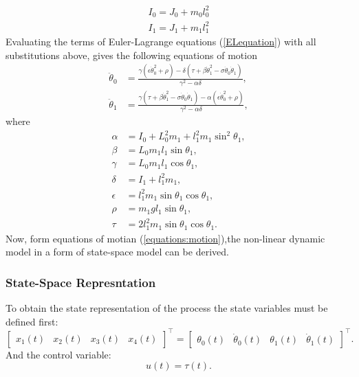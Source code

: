 \begin{subequations}
		\begin{align}
			I_0 = J_0 + m_0l_0^2\\
			I_1 = J_1 + m_1l_1^2
		\end{align}
\end{subequations}
Evaluating the terms of Euler-Lagrange equations (\ref{ELequation}) with all substitutions above, gives the following equations of motion
\begin{subequations}\label{equations:motion}
	\begin{align}
	\ddot{\theta}_0 &= \frac{\gamma(\epsilon\dot{\theta}_0^2+\rho)-\delta(\tau+\beta\dot{\theta}_1^2-\sigma\dot{\theta}_0\dot{\theta}_1)}{\gamma^2-\alpha\delta}\label{motion1},\\
	\ddot{\theta}_1 &= \frac{\gamma(\tau+\beta\dot{\theta}_1^2-\sigma\dot{\theta}_0\dot{\theta}_1)-\alpha(\epsilon\dot{\theta}_0^2+\rho)}{\gamma^2-\alpha\delta}\label{motion2},
	\end{align}
\end{subequations}
where
\begin{subequations}
	\begin{align}
	\alpha &= I_0+L_0^2m_1+l_1^2m_1\sin^2\theta_1,\\
	\beta &= L_0m_1l_1\sin\theta_1, \\
	\gamma &= L_0m_1l_1\cos\theta_1,\\
	\delta &= I_1+l_1^2m_1,\\
	\epsilon &= l^2_1m_1\sin\theta_1\cos\theta_1,\\
	\rho &= m_1gl_1\sin\theta_1,\\
	\tau &= 2l^2_1m_1\sin\theta_1\cos\theta_1.
	\end{align}
\end{subequations}
Now, form equations of motian (\ref{equations:motion}),the non-linear dynamic model in a form of state-space model can be derived.
\subsubsection{State-Space Represntation} 
To obtain the state representation of the process the state variables must be defined first:
\begin{equation}
\begin{bmatrix}
x_1(t)&x_2(t)&x_3(t)&x_4(t)
\end{bmatrix}^\intercal = 
\begin{bmatrix}
\theta_0(t)&\dot{\theta}_0(t)&\theta_1(t)&\dot{\theta}_1(t)
\end{bmatrix}^\intercal.
\end{equation}
And the control variable:
\begin{equation} u(t) = \tau(t). \end{equation}

